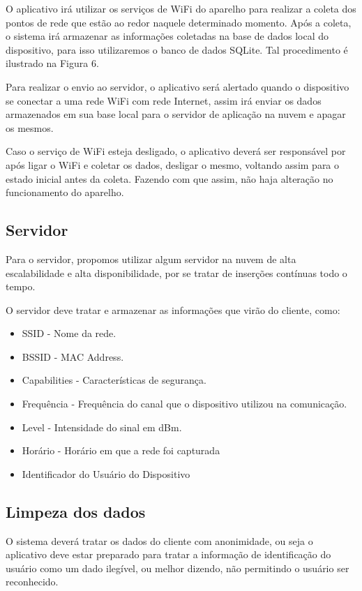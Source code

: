 \documentclass[12pt, %
openright, 
oneside,
a4paper,
brazil]{facom-ufu-abntex2}
\begin{document}
O aplicativo irá utilizar os serviços de \ac{WiFi} do aparelho para realizar a coleta dos pontos de rede que estão ao redor naquele determinado momento. Após a coleta, o sistema irá armazenar as informações coletadas na base de dados local do 	dispositivo, para isso utilizaremos o banco de dados SQLite. Tal procedimento é ilustrado na Figura 6.

Para realizar o envio ao servidor, o aplicativo será alertado quando o dispositivo se conectar a uma rede \ac{WiFi} com rede Internet, assim irá enviar os dados armazenados em sua base local para o servidor de aplicação na nuvem e apagar os mesmos. 

Caso o serviço de \ac{WiFi} esteja desligado, o aplicativo deverá ser responsável por após ligar o \ac{WiFi} e coletar os dados, desligar o mesmo, voltando assim para o estado inicial antes da coleta. Fazendo com que assim, não haja alteração no funcionamento do aparelho.




\subsection{Servidor}
Para o servidor, propomos utilizar algum servidor na nuvem de alta escalabilidade e alta disponibilidade, por se tratar de inserções contínuas todo o tempo.

O servidor deve tratar e  armazenar as informações que virão do cliente, como:
\begin{itemize}
  \item \ac{SSID} - Nome da rede.
  \item  \ac{BSSID} - MAC Address. 
  \item Capabilities - Características de segurança. 
  \item Frequência - Frequência do canal que o dispositivo utilizou na comunicação.
  \item Level - Intensidade do sinal em dBm. 
  \item Horário - Horário em que a rede foi capturada
  \item Identificador do Usuário do Dispositivo
  \end{itemize}
  
\subsection{Limpeza dos dados}
O sistema deverá tratar os dados do cliente com anonimidade, ou seja o aplicativo deve estar preparado para tratar a informação de identificação do usuário como um dado ilegível, ou melhor dizendo, não permitindo o usuário ser reconhecido. 
\end{document}
